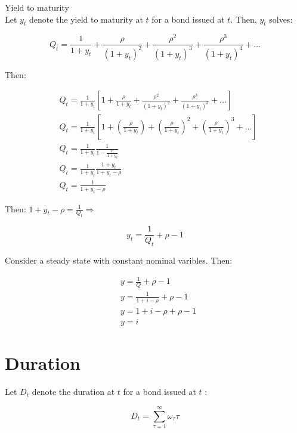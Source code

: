 \documentclass[10pt]{article}
\begin{document}
Yield to maturity\\
Let $y_{t}$ denote the yield to maturity at $t$ for a bond issued at $t$. Then, $y_{t}$ solves:

\begin{equation*}
Q_{t}=\frac{1}{1+y_{t}}+\frac{\rho}{\left(1+y_{t}\right)^{2}}+\frac{\rho^{2}}{\left(1+y_{t}\right)^{3}}+\frac{\rho^{3}}{\left(1+y_{t}\right)^{4}}+\ldots
\end{equation*}

Then:

\begin{equation*}
\begin{aligned}
& Q_{t}=\frac{1}{1+y_{t}}\left[1+\frac{\rho}{1+y_{t}}+\frac{\rho^{2}}{\left(1+y_{t}\right)^{2}}+\frac{\rho^{3}}{\left(1+y_{t}\right)^{3}}+\ldots\right] \\
& Q_{t}=\frac{1}{1+y_{t}}\left[1+\left(\frac{\rho}{1+y_{t}}\right)+\left(\frac{\rho}{1+y_{t}}\right)^{2}+\left(\frac{\rho}{1+y_{t}}\right)^{3}+\ldots\right] \\
& Q_{t}=\frac{1}{1+y_{t}} \frac{1}{1-\frac{\rho}{1+y_{t}}} \\
& Q_{t}=\frac{1}{1+y_{t}} \frac{1+y_{t}}{1+y_{t}-\rho} \\
& Q_{t}=\frac{1}{1+y_{t}-\rho}
\end{aligned}
\end{equation*}

Then: $1+y_{t}-\rho=\frac{1}{Q_{t}} \Rightarrow$

\begin{equation*}
y_{t}=\frac{1}{Q_{t}}+\rho-1
\end{equation*}

Consider a steady state with constant nominal varibles. Then:

\begin{equation*}
\begin{aligned}
& y=\frac{1}{Q}+\rho-1 \\
& y=\frac{1}{1+i-\rho}+\rho-1 \\
& y=1+i-\rho+\rho-1 \\
& y=i
\end{aligned}
\end{equation*}

\section*{Duration}
Let $D_{t}$ denote the duration at $t$ for a bond issued at $t$ :

\begin{equation*}
D_{t}=\sum_{\tau=1}^{\infty} \omega_{\tau} \tau
\end{equation*}
\end{document}
